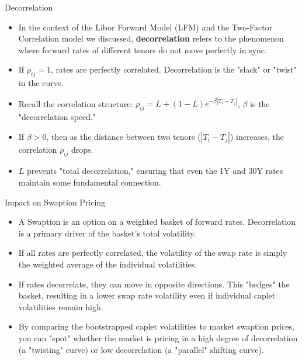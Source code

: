 \documentclass{beamer}
\begin{document}
\begin{frame}{Decorrelation}
	\begin{itemize}
	\item In the context of the Libor Forward Model (LFM) and the Two-Factor Correlation model we discussed, \textbf{decorrelation} refers to the phenomenon where forward rates of different tenors do not move perfectly in sync.
	\item If $\rho_{ij}=1$, rates are perfectly correlated. Decorrelation is the "slack" or "twist" in the curve.
	\item Recall the correlation structure: $\rho_{ij}=L+(1-L)e^{-\beta|T_i-T_j|}$, $\beta$ is the "decorrelation speed."
	\item If $\beta>0$, then as the distance between two tenors ($|T_i-T_j|$) increases, the correlation $\rho_{ij}$ drops.
	\item $L$ prevents "total decorrelation," ensuring that even the 1Y and 30Y rates maintain some fundamental connection.
	\end{itemize}
\end{frame}

\begin{frame}{Impact on Swaption Pricing}
	\begin{itemize}
		\item A Swaption is an option on a weighted basket of forward rates. Decorrelation is a primary driver of the basket's total volatility.
		\item If all rates are perfectly correlated, the volatility of the swap rate is simply the weighted average of the individual volatilities.
		\item If rates decorrelate, they can move in opposite directions. This "hedges" the basket, resulting in a lower swap rate volatility even if individual caplet volatilities remain high.
		\item By comparing the bootstrapped caplet volatilities to market swaption prices, you can "spot" whether the market is pricing in a high degree of decorrelation (a "twisting" curve) or low decorrelation (a "parallel" shifting curve).
	\end{itemize}
\end{frame}
\end{document}
